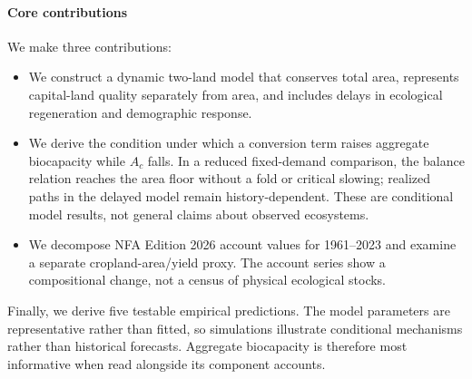 \documentclass[preprint,12pt,authoryear]{elsarticle}
\begin{document}
\paragraph{Core contributions} We make three contributions:
\begin{itemize}
  \item We construct a dynamic two-land model that conserves total area, represents capital-land quality separately from area, and includes delays in ecological regeneration and demographic response.
  \item We derive the condition under which a conversion term raises aggregate biocapacity while $A_c$ falls. In a reduced fixed-demand comparison, the balance relation reaches the area floor without a fold or critical slowing; realized paths in the delayed model remain history-dependent. These are conditional model results, not general claims about observed ecosystems.
  \item We decompose NFA Edition 2026 account values for 1961--2023 and examine a separate cropland-area/yield proxy. The account series show a compositional change, not a census of physical ecological stocks.
\end{itemize}

Finally, we derive five testable empirical predictions. The model parameters are representative rather than fitted, so simulations illustrate conditional mechanisms rather than historical forecasts. Aggregate biocapacity is therefore most informative when read alongside its component accounts.
\end{document}
